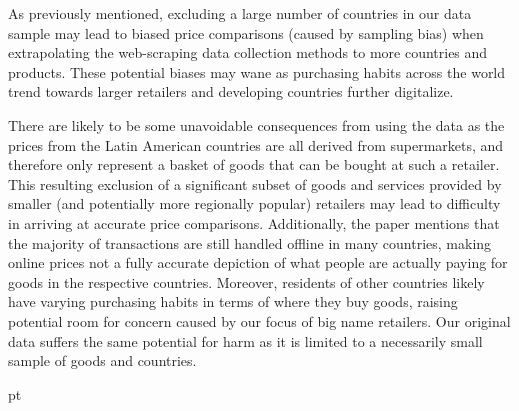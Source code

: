 As previously mentioned, excluding a large number of countries in our data sample may lead to biased price comparisons (caused by sampling bias) when extrapolating the web-scraping data collection methods to more countries and products. These potential biases may wane as purchasing habits across the world trend towards larger retailers and developing countries further digitalize. 

There are likely to be some unavoidable consequences from using the \citet{Cavallo2015} data as the prices from the Latin American countries are all derived from supermarkets, and therefore only represent a basket of goods that can be bought at such a retailer. This resulting exclusion of a significant subset of goods and services provided by smaller (and potentially more regionally popular) retailers may lead to difficulty in arriving at accurate price comparisons.  Additionally, the \citet{Cavallo2015} paper  mentions that the majority of transactions are still handled offline in many countries, making online prices not a fully accurate depiction of what people are actually paying for goods in the respective countries. Moreover, residents of other countries likely have varying purchasing habits in terms of where they buy goods, raising potential room for concern caused by our focus of big name retailers. Our original data suffers the same potential for harm as it is limited to a necessarily small sample of goods and countries. 


 pt













